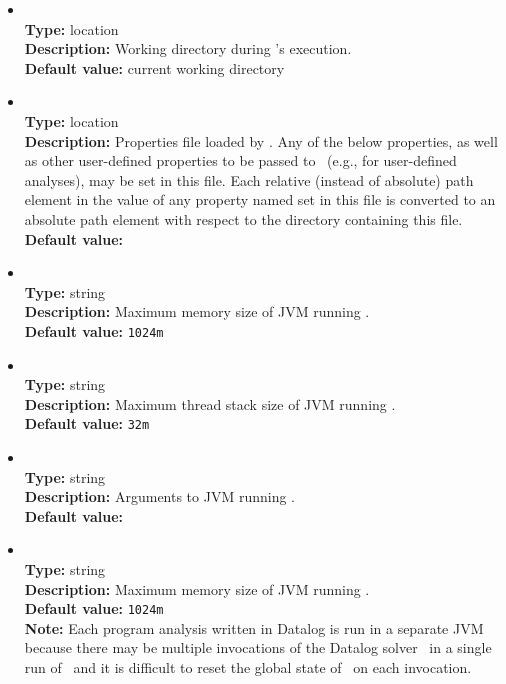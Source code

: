 \begin{itemize}
\item
{} \\
{\bf Type:} location \\
{\bf Description:} Working directory during \Chord's execution. \\
{\bf Default value:} current working directory

\item
{} \\
{\bf Type:} location \\
{\bf Description:} Properties file loaded by .  Any of the below properties, as well as other user-defined properties to be passed to \Chord\ (e.g., for user-defined analyses), may be set in this file.  Each relative (instead of absolute) path element in the value of any property named  set in this file is converted to an absolute path element with respect to the directory containing this file. \\
{\bf Default value:}  

\item
{} \\
{\bf Type:} string \\
{\bf Description:} Maximum memory size of JVM running \Chord. \\
{\bf Default value:} {\tt 1024m} 

\item 
{} \\
{\bf Type:} string \\
{\bf Description:} Maximum thread stack size of JVM running \Chord. \\
{\bf Default value:} {\tt 32m} 

\item
{} \\
{\bf Type:} string \\
{\bf Description:} Arguments to JVM running \Chord. \\
{\bf Default value:}    

\item
{} \\
{\bf Type:} string \\
{\bf Description:} Maximum memory size of JVM running \bddbddb. \\
{\bf Default value:} {\tt 1024m} \\
{\bf Note:} Each program analysis written in Datalog is run in a separate JVM because there may be multiple invocations of the Datalog solver \bddbddb\ in a single run of \Chord\ and it is difficult to reset the global state of \bddbddb\ on each invocation.
\end{itemize}

